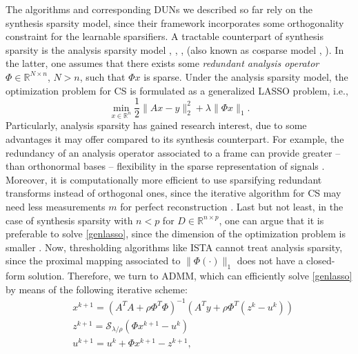 \documentclass[preprint,12pt]{elsarticle}
\newcommand{\rn}{\mathbb{R}^n}
\newcommand{\RNn}{\mathbb{R}^{N\times n}}
\newcommand{\st}{\mathcal{S}}\newcommand{\sgn}{\mathrm{sign}}
\begin{document}
The algorithms and corresponding DUNs we described so far rely on the synthesis sparsity model, since their framework incorporates some orthogonality constraint for the learnable sparsifiers. A tractable counterpart of synthesis sparsity is the analysis sparsity model \cite{robustanal}, \cite{star}, \cite{genzel}, (also known as cosparse model \cite{cosparse}, \cite{cosparsity}). In the latter, one assumes that there exists some \textit{redundant analysis operator} $\Phi\in\RNn$, $N>n$, such that $\Phi x$ is sparse. Under the analysis sparsity model, the optimization problem for CS is formulated as a generalized LASSO problem, i.e.,
\begin{equation}
    \label{genlasso}
    \min_{x\in\rn}\frac{1}{2}\|Ax-y\|_2^2+\lambda\|\Phi x\|_1.
\end{equation}
Particularly, analysis sparsity has gained research interest, due to some advantages it may offer compared to its synthesis counterpart. For example, the redundancy of an analysis operator associated to a frame \cite{christensen} can provide greater -- than orthonormal bases -- flexibility in the sparse representation of signals \cite{casazza}. Moreover, it is computationally more efficient to use sparsifying redundant transforms instead of orthogonal ones, since the iterative algorithm for CS may need less measurements $m$ for perfect reconstruction \cite{genzel}. Last but not least, in the case of synthesis sparsity with $n<p$ for $D\in\mathbb{R}^{n\times p}$, one can argue that it is preferable to solve \eqref{genlasso}, since the dimension of the optimization problem is smaller \cite{analvssyn}. Now, thresholding algorithms like ISTA cannot treat analysis sparsity, since the proximal mapping associated to $\|\Phi(\cdot)\|_1$ does not have a closed-form solution. Therefore, we turn to ADMM, which can efficiently solve \eqref{genlasso} by means of the following iterative scheme:
\begin{align}
\label{xup}
    &x^{k+1}=(A^TA+\rho \Phi^T\Phi)^{-1}(A^Ty+\rho \Phi^T(z^k-u^k))\\
    \label{zup}
        &z^{k+1}=\st_{\lambda/\rho}(\Phi x^{k+1}-u^k)\\
        \label{uup}
        &u^{k+1}=u^k+\Phi x^{k+1}-z^{k+1},
\end{align}
\end{document}
